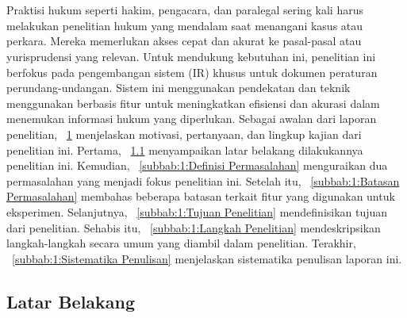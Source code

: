 \chapter{\babSatu}
\label{bab:1}
Praktisi hukum seperti hakim, pengacara, dan paralegal sering kali harus melakukan penelitian hukum yang mendalam saat menangani kasus atau perkara. Mereka memerlukan akses cepat dan akurat ke pasal-pasal atau yurisprudensi yang relevan. Untuk mendukung kebutuhan ini, penelitian ini berfokus pada pengembangan sistem \ir{} (IR) khusus untuk dokumen peraturan perundang-undangan. Sistem ini menggunakan pendekatan \cascaded{} \retrieval{} dan teknik \reranking{} menggunakan \reranker{} berbasis fitur untuk meningkatkan efisiensi dan akurasi dalam menemukan informasi hukum yang diperlukan. Sebagai awalan dari laporan penelitian, \subbab{}~\ref{bab:1} menjelaskan motivasi, pertanyaan, dan lingkup kajian dari penelitian ini. Pertama, \subbab{}~\ref{subbab:1:Latar Belakang} menyampaikan latar belakang dilakukannya penelitian ini. Kemudian, \subbab{}~\ref{subbab:1:Definisi Permasalahan} menguraikan dua permasalahan yang menjadi fokus penelitian ini. Setelah itu, \subbab{}~\ref{subbab:1:Batasan Permasalahan} membahas beberapa batasan terkait fitur yang digunakan untuk eksperimen. Selanjutnya, \subbab{}~\ref{subbab:1:Tujuan Penelitian} mendefinisikan tujuan dari penelitian. Sehabis itu, \subbab{}~\ref{subbab:1:Langkah Penelitian} mendeskripsikan langkah-langkah secara umum yang diambil dalam penelitian. Terakhir, \subbab{}~\ref{subbab:1:Sistematika Penulisan} menjelaskan sistematika penulisan laporan ini.





\section{Latar Belakang}
\label{subbab:1:Latar Belakang}

